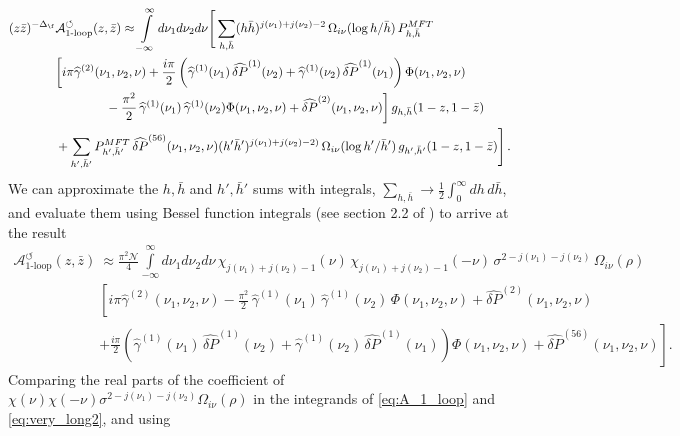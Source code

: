 \begin{align}
(z\bar{z})^{-\Delta_{\f}}& \mathcal{A}_{\text{1-loop}}^{\circlearrowleft}(z,\bar{z}) \approx \int\limits_{-\infty}^{\infty} d\nu_{1}d\nu_2d\nu \Bigg[\sum_{h,\bar{h}}  (h\bar{h})^{j(\nu_1) +j(\nu_2) -2}\,\Omega_{i\nu}(\log h/\bar{h})\, P^{MFT}_{h,\bar{h}}  
\label{eq:very_long}    \\
%
		& \bigg[i\pi \widehat{\gamma}^{(2)}(\nu_1,\nu_2,\nu)  + \frac{i\pi}{2}\left(\widehat{\gamma}^{(1)}(\nu_1)\,\widehat{\delta P}^{(1)}(\nu_2) + \widehat{\gamma}^{(1)}(\nu_2)\,\widehat{\delta P}^{(1)}(\nu_1)\right)\Phi(\nu_1,\nu_2,\nu)   \nonumber\\
		&  \qquad  \qquad -\frac{\pi^2}{2}\,\widehat{\gamma}^{(1)}(\nu_1)\,\widehat{\gamma}^{(1)}(\nu_2)\Phi(\nu_1,\nu_2,\nu) + \widehat{\delta P}^{(2)}(\nu_1,\nu_2,\nu)   \bigg]\, g_{h,\bar{h}}(1-z,1-\bar{z}) \nonumber \\
		&  + \sum_{h',\bar{h}'} P^{MFT}_{h',\bar{h}'} \,\widehat{\delta P}^{(56)}(\nu_1,\nu_2,\nu) (h'\bar{h}')^{j(\nu_1) +j(\nu_2) -2)}\,\Omega_{i\nu}(\log h'/\bar{h}') \,g_{h',\bar{h}'}(1-z,1-\bar{z}) \Bigg]\,.
		 \nonumber
\end{align}
We can approximate the $h,\bar{h}$ and $h',\bar{h}'$ sums with integrals, $\sum_{h,\bar{h}} \rightarrow \frac{1}{2}\int_{0}^{\infty}dh\, d\bar{h}$, and evaluate them using Bessel function integrals (see section 2.2 of \cite{Meltzer:2019pyl}) to arrive at the result
\begin{align}
\mathcal{A}_{\text{1-loop}}^{\circlearrowleft}(z,\bar{z})&\approx \frac{\pi^2 \mathcal{N}}{4}\int\limits_{-\infty}^{\infty} d\nu_{1}d\nu_2d\nu \, \chi_{j(\nu_1)+j(\nu_2)-1}(\nu)\,\chi_{j(\nu_1)+j(\nu_2)-1}(-\nu) \,
 			\sigma^{2-j(\nu_1)-j(\nu_2)} \,\Omega_{i\nu}(\rho) \nonumber  \\
		& \left[ i\pi \widehat{\gamma}^{(2)}(\nu_1,\nu_2,\nu)  -\frac{\pi^2}{2}\,\widehat{\gamma}^{(1)}(\nu_1)\,\widehat{\gamma}^{(1)}(\nu_2)\,\Phi(\nu_1,\nu_2,\nu) + \widehat{\delta P}^{(2)}(\nu_1,\nu_2,\nu) \right.  
\label{eq:very_long2}  \\
		&  \left. + \frac{i\pi}{2}\left(\widehat{\gamma}^{(1)}(\nu_1)\,\widehat{\delta P}^{(1)}(\nu_2) + \widehat{\gamma}^{(1)}(\nu_2)\,\widehat{\delta P}^{(1)}(\nu_1)\right)\Phi(\nu_1,\nu_2,\nu) + \widehat{\delta P}^{(56)}(\nu_1,\nu_2,\nu) \right] .
\nonumber
\end{align}
%
%
%
%
%
%
Comparing the real parts of the coefficient of $\chi(\nu)\chi(-\nu)\sigma^{2-j(\nu_1)-j(\nu_2)} \Omega_{i\nu}(\rho)$ in the integrands of \eqref{eq:A_1_loop} and \eqref{eq:very_long2}, and using
